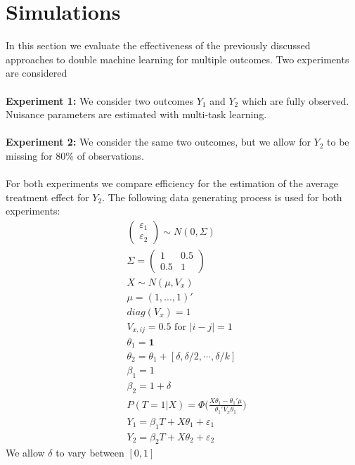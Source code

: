 \documentclass[12pt]{article}
\begin{document}
\section{Simulations}
In this section we evaluate the effectiveness of the previously discussed approaches to double machine learning for multiple outcomes. Two experiments are considered\\
\\
\textbf{Experiment 1:} We consider two outcomes $Y_1$ and $Y_2$ which are fully observed. Nuisance parameters are estimated with multi-task learning.\\
\\
\textbf{Experiment 2:} We consider the same two outcomes, but we allow for $Y_2$ to be missing for 80\% of observations. \\
\\
For both experiments we compare efficiency for the estimation of the average treatment effect for $Y_2$. The following data generating process is used for both experiments:
\begin{align*}
	&\begin{pmatrix}
	\varepsilon_1\\
	\varepsilon_2
	\end{pmatrix} \sim N(0,\Sigma)\\
	&\Sigma = 
	\begin{pmatrix}
		1 & 0.5 \\
		0.5 & 1
	\end{pmatrix}\\
	&X \sim N(\mu,V_x)\\
	&\mu = (1, ..., 1)'\\
	&diag(V_x) = 1\\
	&V_{x,ij} = 0.5 \text{ for } |i-j|=1\\
	&\theta_1 = \mathbf{1}\\
	&\theta_2 = \theta_1 + [\delta,\delta/2,\cdots,\delta/k]\\
	&\beta_1 = 1\\
	&\beta_2 = 1 + \delta\\
	&P(T=1|X) = \Phi\Bigg(\frac{X\theta_1 -\theta_1'\mu}{\theta_1'V_x\theta_1}\Bigg)\\
	&Y_1 = \beta_1T + X\theta_1 + \varepsilon_1\\
	&Y_2 = \beta_2T + X\theta_2 + \varepsilon_2
\end{align*}
We allow $\delta$ to vary between $[0,1]$
\end{document}
